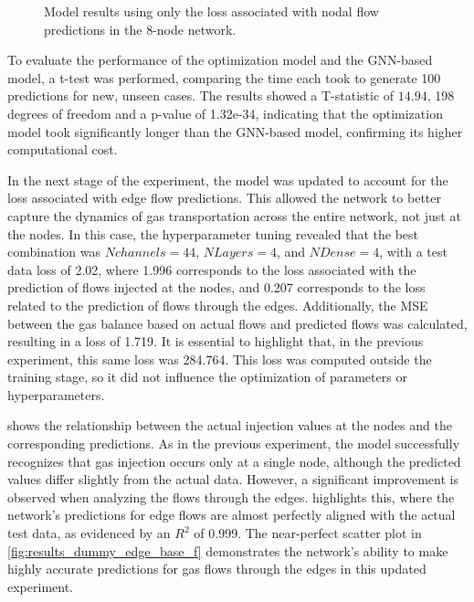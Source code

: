 \begin{figure}
    \centering
    \setlength{}        
    \setlength{} 
    
    \caption{Model results using only the loss associated with nodal flow predictions in the 8-node network.}
    \label{fig:dummy_base_results}
\end{figure}



To evaluate the performance of the optimization model and the GNN-based model, a t-test was performed, comparing the time each took to generate 100 predictions for new, unseen cases. The results showed a T-statistic of $14.94$, 198 degrees of freedom and a p-value of 1.32e-34, indicating that the optimization model took significantly longer than the GNN-based model, confirming its higher computational cost.


In the next stage of the experiment, the model was updated to account for the loss associated with edge flow predictions. This allowed the network to better capture the dynamics of gas transportation across the entire network, not just at the nodes. In this case, the hyperparameter tuning revealed that the best combination was $N channels=44$, $N Layers=4$, and $N Dense=4$, with a test data loss of 2.02, where 1.996 corresponds to the loss associated with the prediction of flows injected at the nodes, and 0.207 corresponds to the loss related to the prediction of flows through the edges. Additionally, the MSE between the gas balance based on actual flows and predicted flows was calculated, resulting in a loss of 1.719. It is essential to highlight that, in the previous experiment, this same loss was 284.764. This loss was computed outside the training stage, so it did not influence the optimization of parameters or hyperparameters.


 shows the relationship between the actual injection values at the nodes and the corresponding predictions. As in the previous experiment, the model successfully recognizes that gas injection occurs only at a single node, although the predicted values differ slightly from the actual data. However, a significant improvement is observed when analyzing the flows through the edges.  highlights this, where the network's predictions for edge flows are almost perfectly aligned with the actual test data, as evidenced by an $R^2$ of 0.999. The near-perfect scatter plot in \cref{fig:results_dummy_edge_base_f} demonstrates the network's ability to make highly accurate predictions for gas flows through the edges in this updated experiment.



